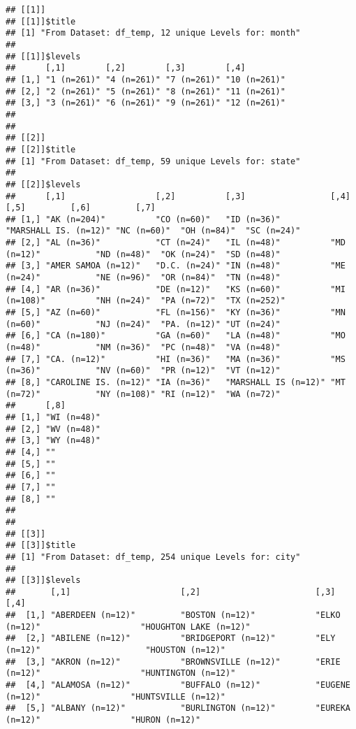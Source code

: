 \documentclass[
]{book}
\begin{document}
\begin{verbatim}
## [[1]]
## [[1]]$title
## [1] "From Dataset: df_temp, 12 unique Levels for: month"
## 
## [[1]]$levels
##      [,1]        [,2]        [,3]        [,4]        
## [1,] "1 (n=261)" "4 (n=261)" "7 (n=261)" "10 (n=261)"
## [2,] "2 (n=261)" "5 (n=261)" "8 (n=261)" "11 (n=261)"
## [3,] "3 (n=261)" "6 (n=261)" "9 (n=261)" "12 (n=261)"
## 
## 
## [[2]]
## [[2]]$title
## [1] "From Dataset: df_temp, 59 unique Levels for: state"
## 
## [[2]]$levels
##      [,1]                  [,2]          [,3]                 [,4]                  [,5]         [,6]         [,7]        
## [1,] "AK (n=204)"          "CO (n=60)"   "ID (n=36)"          "MARSHALL IS. (n=12)" "NC (n=60)"  "OH (n=84)"  "SC (n=24)" 
## [2,] "AL (n=36)"           "CT (n=24)"   "IL (n=48)"          "MD (n=12)"           "ND (n=48)"  "OK (n=24)"  "SD (n=48)" 
## [3,] "AMER SAMOA (n=12)"   "D.C. (n=24)" "IN (n=48)"          "ME (n=24)"           "NE (n=96)"  "OR (n=84)"  "TN (n=48)" 
## [4,] "AR (n=36)"           "DE (n=12)"   "KS (n=60)"          "MI (n=108)"          "NH (n=24)"  "PA (n=72)"  "TX (n=252)"
## [5,] "AZ (n=60)"           "FL (n=156)"  "KY (n=36)"          "MN (n=60)"           "NJ (n=24)"  "PA. (n=12)" "UT (n=24)" 
## [6,] "CA (n=180)"          "GA (n=60)"   "LA (n=48)"          "MO (n=48)"           "NM (n=36)"  "PC (n=48)"  "VA (n=48)" 
## [7,] "CA. (n=12)"          "HI (n=36)"   "MA (n=36)"          "MS (n=36)"           "NV (n=60)"  "PR (n=12)"  "VT (n=12)" 
## [8,] "CAROLINE IS. (n=12)" "IA (n=36)"   "MARSHALL IS (n=12)" "MT (n=72)"           "NY (n=108)" "RI (n=12)"  "WA (n=72)" 
##      [,8]       
## [1,] "WI (n=48)"
## [2,] "WV (n=48)"
## [3,] "WY (n=48)"
## [4,] ""         
## [5,] ""         
## [6,] ""         
## [7,] ""         
## [8,] ""         
## 
## 
## [[3]]
## [[3]]$title
## [1] "From Dataset: df_temp, 254 unique Levels for: city"
## 
## [[3]]$levels
##       [,1]                      [,2]                       [,3]                             [,4]                        
##  [1,] "ABERDEEN (n=12)"         "BOSTON (n=12)"            "ELKO (n=12)"                    "HOUGHTON LAKE (n=12)"      
##  [2,] "ABILENE (n=12)"          "BRIDGEPORT (n=12)"        "ELY (n=12)"                     "HOUSTON (n=12)"            
##  [3,] "AKRON (n=12)"            "BROWNSVILLE (n=12)"       "ERIE (n=12)"                    "HUNTINGTON (n=12)"         
##  [4,] "ALAMOSA (n=12)"          "BUFFALO (n=12)"           "EUGENE (n=12)"                  "HUNTSVILLE (n=12)"         
##  [5,] "ALBANY (n=12)"           "BURLINGTON (n=12)"        "EUREKA (n=12)"                  "HURON (n=12)"              

\end{verbatim}
\end{document}
